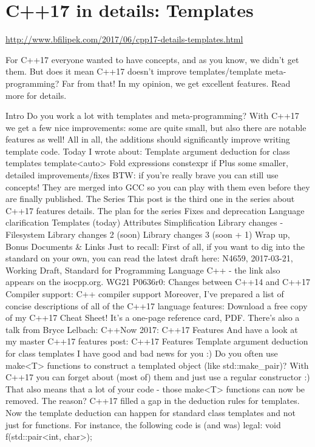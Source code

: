 \section{C++17 in details: Templates }
\url{http://www.bfilipek.com/2017/06/cpp17-details-templates.html}

For C++17 everyone wanted to have concepts, and as you know, we didn't get them. But does it mean C++17 doesn’t improve templates/template meta-programming? Far from that! In my opinion, we get excellent features. 
Read more for details.

Intro
Do you work a lot with templates and meta-programming? 
With C++17 we get a few nice improvements: some are quite small, but also there are notable features as well! All in all, the additions should significantly improve writing template code.
Today I wrote about:
Template argument deduction for class templates
template<auto>
Fold expressions
constexpr if
Plus some smaller, detailed improvements/fixes
BTW: if you’re really brave you can still use concepts! They are merged into GCC so you can play with them even before they are finally published.
The Series
This post is the third one in the series about C++17 features details.
The plan for the series
Fixes and deprecation
Language clarification
Templates (today)
Attributes
Simplification
Library changes - Filesystem
Library changes 2 (soon)
Library changes 3 (soon + 1)
Wrap up, Bonus
Documents & Links
Just to recall:
First of all, if you want to dig into the standard on your own, you can read the latest draft here: 
N4659, 2017-03-21, Working Draft, Standard for Programming Language C++ - the link also appears on the isocpp.org.
WG21 P0636r0: Changes between C++14 and C++17
Compiler support: C++ compiler support
Moreover, I’ve prepared a list of concise descriptions of all of the C++17 language features: 
Download a free copy of my C++17 Cheat Sheet! 
It’s a one-page reference card, PDF.
There’s also a talk from Bryce Lelbach: C++Now 2017: C++17 Features
And have a look at my master C++17 features post: C++17 Features
Template argument deduction for class templates
I have good and bad news for you :)
Do you often use make<T> functions to construct a templated object (like std::make_pair)? 
With C++17 you can forget about (most of) them and just use a regular constructor :) 
That also means that a lot of your code - those make<T> functions can now be removed.
The reason?
C++17 filled a gap in the deduction rules for templates. Now the template deduction can happen for standard class templates and not just for functions.
For instance, the following code is (and was) legal:
void f(std::pair<int, char>);

